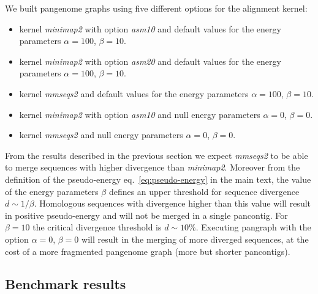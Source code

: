 \documentclass[aps,rmp,reprint,superscriptaddress,notitlepage,10pt,onecolumn]{revtex4-1}
\begin{document}
We built pangenome graphs using five different options for the alignment kernel:
\begin{itemize}
    \item kernel \textit{minimap2} with option \textit{asm10} and default values for the energy parameters $\alpha=100$, $\beta=10$.
    \item kernel \textit{minimap2} with option \textit{asm20} and default values for the energy parameters $\alpha=100$, $\beta=10$.
    \item kernel \textit{mmseqs2} and default values for the energy parameters $\alpha=100$, $\beta=10$.
    \item kernel \textit{minimap2} with option \textit{asm10} and null energy parameters $\alpha=0$, $\beta=0$.
    \item kernel \textit{mmseqs2} and null energy parameters $\alpha=0$, $\beta=0$.
\end{itemize}
From the results described in the previous section we expect \textit{mmseqs2} to be able to merge sequences with higher divergence than \textit{minimap2}. Moreover from the definition of the pseudo-energy eq.~\ref{eq:pseudo-energy} in the main text, the value of the energy parameters $\beta$ defines an upper threshold for sequence divergence $d \sim 1/\beta$. Homologous sequences with divergence higher than this value will result in positive pseudo-energy and will not be merged in a single pancontig. For $\beta=10$ the critical divergence threshold is $d \sim 10\%$. Executing pangraph with the option $\alpha=0$, $\beta=0$ will result in the merging of more diverged sequences, at the cost of a more fragmented pangenome graph (more but shorter pancontigs).


\subsection{Benchmark results}
\end{document}

